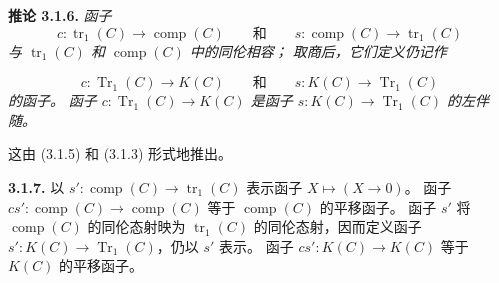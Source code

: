 \noindent\textbf{推论 3.1.6.}\quad
\emph{函子}
\begin{equation*}
  c\colon\operatorname{tr}_1(C)\longrightarrow\operatorname{comp}(C)
  \qquad\text{和}\qquad
  s\colon\operatorname{comp}(C)\longrightarrow\operatorname{tr}_1(C)
\end{equation*}
\emph{与 $\operatorname{tr}_1(C)$ 和 $\operatorname{comp}(C)$ 中的同伦相容；
取商后，它们定义仍记作}

\begin{equation*}
  c\colon\operatorname{Tr}_1(C)\longrightarrow K(C)
  \qquad\text{和}\qquad
  s\colon K(C)\longrightarrow\operatorname{Tr}_1(C)
\end{equation*}
\emph{的函子。}
\emph{函子 $c\colon\operatorname{Tr}_1(C)\longrightarrow K(C)$ 是函子
$s\colon K(C)\longrightarrow\operatorname{Tr}_1(C)$ 的左伴随。}

这由 (3.1.5) 和 (3.1.3) 形式地推出。

\noindent\textbf{3.1.7.}\quad
{}
以 $s'\colon\operatorname{comp}(C)\longrightarrow\operatorname{tr}_1(C)$
表示函子 $X\longmapsto(X\longrightarrow 0)$。
函子 $cs'\colon\operatorname{comp}(C)\longrightarrow\operatorname{comp}(C)$
等于 $\operatorname{comp}(C)$ 的平移函子。
函子 $s'$ 将 $\operatorname{comp}(C)$ 的同伦态射映为
$\operatorname{tr}_1(C)$ 的同伦态射，因而定义函子
$s'\colon K(C)\longrightarrow\operatorname{Tr}_1(C)$，仍以 $s'$ 表示。
函子 $cs'\colon K(C)\longrightarrow K(C)$ 等于 $K(C)$ 的平移函子。
